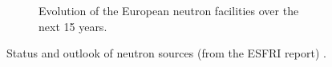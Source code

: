 \begin{figure}[!ht]
\begin{subfigure}[t]{0.5\textwidth}
		\caption{Evolution of the European neutron facilities over the next 15 years.}
		\label{}
	\end{subfigure}
	\caption[Status and outlook of neutron sources (from the ESFRI report)]{Status and outlook of neutron sources (from the ESFRI report) \cite{neutron2016}.}
	\label{chap1:fig:NeutronSources}
\end{figure}
